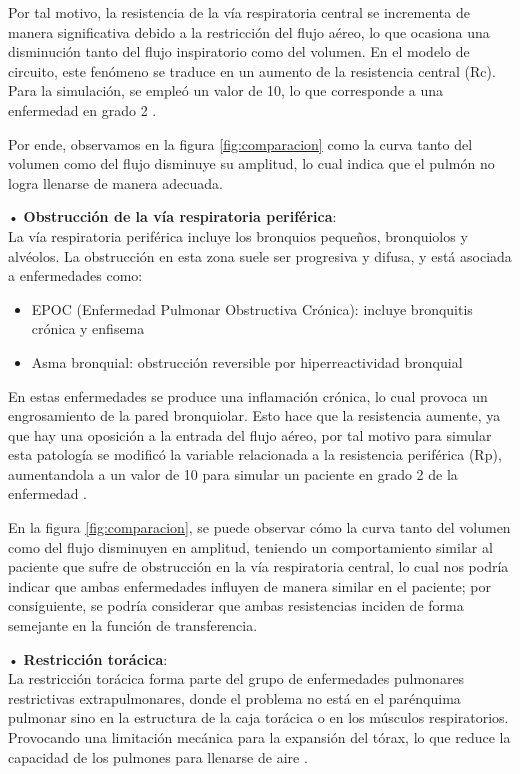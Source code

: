 \documentclass[journal]{IEEEtran}
\begin{document}
Por tal motivo, la resistencia de la vía respiratoria central se incrementa de manera significativa debido a la restricción del flujo aéreo, lo que ocasiona una disminución tanto del flujo inspiratorio como del volumen. En el modelo de circuito, este fenómeno se traduce en un aumento de la resistencia central (Rc). Para la simulación, se empleó un valor de 10, lo que corresponde a una enfermedad en grado 2 \cite{nguyen2010respiratory}.

Por ende, observamos en la figura \ref{fig:comparacion} como la curva tanto del volumen como del flujo disminuye su amplitud, lo cual indica que el pulmón no logra llenarse de manera adecuada. \bigskip

•	\textbf{Obstrucción de la vía respiratoria periférica}:\\
La vía respiratoria periférica incluye los bronquios pequeños, bronquiolos y alvéolos. La obstrucción en esta zona suele ser progresiva y difusa, y está asociada a enfermedades como:
\begin{itemize}
    \item EPOC (Enfermedad Pulmonar Obstructiva Crónica): incluye bronquitis crónica y enfisema \cite{nguyen2010respiratory}\cite{contreras2000epoc}
    \item Asma bronquial: obstrucción reversible por hiperreactividad bronquial \cite{nguyen2010respiratory}
\end{itemize}

En estas enfermedades se produce una inflamación crónica, lo cual provoca un engrosamiento de la pared bronquiolar. Esto hace que la resistencia aumente, ya que hay una oposición a la entrada del flujo aéreo, por tal motivo para simular esta patología se modificó la variable relacionada a la resistencia periférica (Rp), aumentandola a un valor de 10 para simular un paciente en grado 2 de la enfermedad \cite{nguyen2010respiratory}\cite{contreras2000epoc}. 

En la figura \ref{fig:comparacion}, se puede observar cómo la curva tanto del volumen como del flujo disminuyen en amplitud, teniendo un comportamiento similar al paciente que sufre de obstrucción en la vía respiratoria central, lo cual nos podría indicar que ambas enfermedades influyen de manera similar en el paciente; por consiguiente, se podría considerar que ambas resistencias inciden de forma semejante en la función de transferencia. \bigskip

•	\textbf{Restricción torácica}:\\
La restricción torácica forma parte del grupo de enfermedades pulmonares restrictivas extrapulmonares, donde el problema no está en el parénquima pulmonar sino en la estructura de la caja torácica o en los músculos respiratorios. Provocando una limitación mecánica para la expansión del tórax, lo que reduce la capacidad de los pulmones para llenarse de aire \cite{resmed2025restrictive}. 
\end{document}
